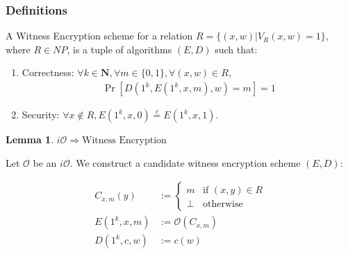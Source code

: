 \documentclass{article}
\newtheorem{lemma}[corollary]{Lemma}
\newcommand{\N}{{\mathbf N}}
\newcommand{\ci}{\stackrel{c}{=}}
\newcommand{\io}{i\mathcal{O}}
\begin{document}
    \subsubsection{Definitions}
    A Witness Encryption scheme for a relation $R = \{(x, w) | V_R(x, w) = 1\}$, where $R \in NP$, is a tuple of algorithms $(E, D)$ such that:
        \begin{enumerate}
            \item Correctness: $\forall{k}\in\N, \forall{m}\in\{0, 1\},\forall{(x, w)}\in R,$
                \begin{align*}
                    \Pr[D(1^k, E(1^k, x, m), w) = m] = 1
                \end{align*}
            \item Security: $\forall{x}\not\in R, E(1^k, x, 0) \ci E(1^k, x, 1)$.
        \end{enumerate}
\begin{lemma}
$\io \Rightarrow \text{Witness Encryption}$
\end{lemma}
Let $\mathcal{O}$ be an $\io$. We construct a candidate witness encryption scheme $(E, D)$:
\begin{mdframed}%
\begin{align*}
    C_{x,m}(y) &:= \left\{\begin{array}{cc}
                                m& \text{if $(x, y) \in R$} \\
                                \bot& \text{otherwise}
                            \end{array}\right. \\
    E(1^k, x, m) &:= \mathcal{O}(C_{x, m}) \\
    D(1^k, c, w) &:= c(w)
\end{align*}
\end{mdframed}
\end{document}
